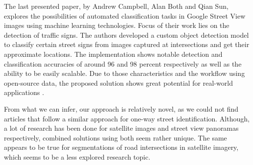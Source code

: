 The last presented paper, by Andrew Campbell, Alan Both and Qian Sun, explores the possibilities of automated classification tasks in Google Street View images using machine learning technologies. Focus of their work lies on the detection of traffic signs. The authors developed a custom object detection model to classify certain street signs from images captured at intersections and get their approximate locations. The implementation shows notable detection and classification accuracies of around 96 and 98 percent respectively as well as the ability to be easily scalable. Due to those characteristics and the workflow using open-source data, the proposed solution shows great potential for real-world applications \cite{relWork4}.

From what we can infer, our approach is relatively novel, as we could not find articles that follow a similar approach for one-way street identification. Although, a lot of research has been done for satellite images and street view panoramas respectively, combined solutions using both seem rather unique. The same appears to be true for segmentations of road intersections in satellite imagery, which seems to be a less explored research topic.